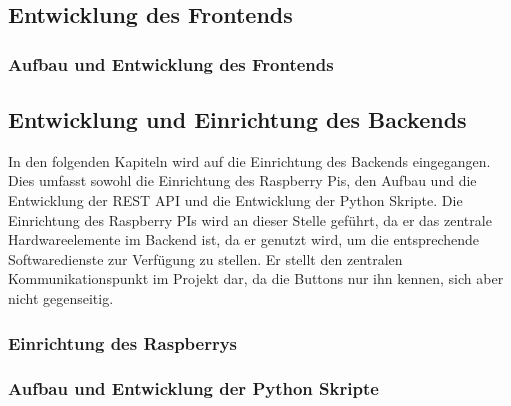 \newpage

\subsection{Entwicklung des Frontends}  
\label{sec:Entwicklung der Frontends-1} 

\subsubsection{Aufbau und Entwicklung des Frontends}  
\label{sec:Aufbau und Entwicklung des Frontends-1}

\newpage

\subsection{Entwicklung und Einrichtung des Backends}  
\label{sec:Entwicklung und Einrichtung des Backends-1} 

In den folgenden Kapiteln wird auf die Einrichtung des Backends eingegangen. Dies umfasst sowohl die Einrichtung des Raspberry Pis, den Aufbau und die Entwicklung der \ac{REST} \ac{API} und die Entwicklung der Python Skripte. Die Einrichtung des Raspberry PIs wird an dieser Stelle geführt, da er das zentrale Hardwareelemente im Backend ist, da er genutzt wird, um die entsprechende Softwaredienste zur Verfügung zu stellen. Er stellt den zentralen Kommunikationspunkt im Projekt dar, da die Buttons nur ihn kennen, sich aber nicht gegenseitig. 

\subsubsection{Einrichtung des Raspberrys}  
\label{sec:Einrichtung des Raspberrys-1}



\subsubsection{Aufbau und Entwicklung der Python Skripte}  
\label{sec:Aufbau und Entwicklung der Python Skripte-1}



\newpage